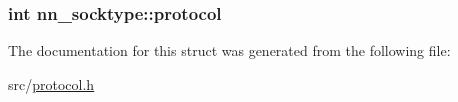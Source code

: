 \subsubsection[{protocol}]{\setlength{\rightskip}{0pt plus 5cm}int nn\+\_\+socktype\+::protocol}\hypertarget{structnn__socktype_a480a3fa2959895e5b761bc32f6be0a68}{}\label{structnn__socktype_a480a3fa2959895e5b761bc32f6be0a68}


The documentation for this struct was generated from the following file\+:\begin{DoxyCompactItemize}
\item 
src/\hyperlink{protocol_8h}{protocol.\+h}\end{DoxyCompactItemize}
